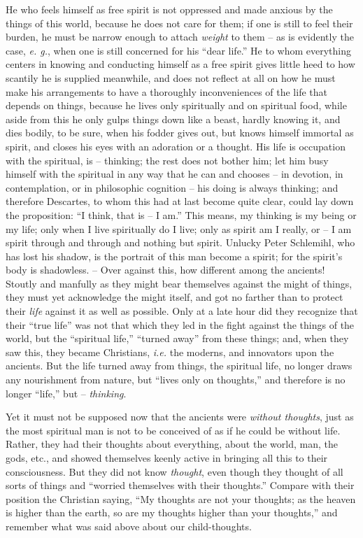 \documentclass[12pt,a4paper]{book}
\begin{document}
He who feels himself as free spirit is not oppressed and made anxious by the 
things of this world, because he does not care for them; if one is still to 
feel their burden, he must be narrow enough to attach \textit{weight} to them 
-- as is evidently the case, \textit{e. g.}, when one is still concerned for 
his ``dear life.'' He to whom everything centers in knowing and conducting 
himself as a free spirit gives little heed to how scantily he is supplied 
meanwhile, and does not reflect at all on how he must make his arrangements to 
have a thoroughly inconveniences of the life that depends on things, because 
he lives only spiritually and on spiritual food, while aside from this he only 
gulps things down like a beast, hardly knowing it, and dies bodily, to be 
sure, when his fodder gives out, but knows himself immortal as spirit, and 
closes his eyes with an adoration or a thought. His life is occupation with 
the spiritual, is -- thinking; the rest does not bother him; let him busy 
himself with the spiritual in any way that he can and chooses -- in devotion, 
in contemplation, or in philosophic cognition -- his doing is always thinking; 
and therefore Descartes, to whom this had at last become quite clear, could 
lay down the proposition: ``I think, that is -- I am.'' This means, my 
thinking is my being or my life; only when I live spiritually do I live; only 
as spirit am I really, or -- I am spirit through and through and nothing but 
spirit. Unlucky Peter Schlemihl, who has lost his shadow, is the portrait of 
this man become a spirit; for the spirit's body is shadowless. -- Over against 
this, how different among the ancients! Stoutly and manfully as they might 
bear themselves against the might of things, they must yet acknowledge the 
might itself, and got no farther than to protect their \textit{life} against 
it as well as possible. Only at a late hour did they recognize that their 
``true life'' was not that which they led in the fight against the things of 
the world, but the ``spiritual life,'' ``turned away'' from these things; 
and, when they saw this, they became Christians, \textit{i.e.} the moderns, 
and innovators upon the ancients. But the life turned away from things, the 
spiritual life, no longer draws any nourishment from nature, but ``lives only 
on thoughts,'' and therefore is no longer ``life,'' but -- 
\textit{thinking}.

Yet it must not be supposed now that the ancients were \textit{without 
thoughts}, just as the most spiritual man is not to be conceived of as if he 
could be without life. Rather, they had their thoughts about everything, about 
the world, man, the gods, etc., and showed themselves keenly active in 
bringing all this to their consciousness. But they did not know 
\textit{thought}, even though they thought of all sorts of things and 
``worried themselves with their thoughts.'' Compare with their position the 
Christian saying, ``My thoughts are not your thoughts; as the heaven is 
higher than the earth, so are my thoughts higher than your thoughts,'' and 
remember what was said above about our child-thoughts.
\end{document}
